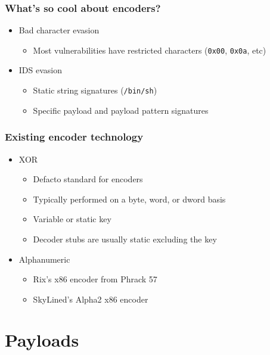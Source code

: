 \documentclass{beamer}
\newenvironment{sitemize}{\vspace{1mm}\begin{itemize}\itemsep 4pt\small}{\end{itemize}}
\begin{document}
\begin{frame}[t]
    \frametitle{What's so cool about encoders?}

    \begin{sitemize}
        \item Bad character evasion
        \begin{sitemize}
            \item Most vulnerabilities have restricted characters
            (\texttt{0x00}, \texttt{0x0a}, etc)
        \end{sitemize}

        \pause
        \item IDS evasion
        \begin{sitemize}
            \item Static string signatures
            (\texttt{/bin/sh})
            \item Specific payload and payload pattern signatures
        \end{sitemize}
    \end{sitemize}
\end{frame}

\begin{frame}[t]
    \frametitle{Existing encoder technology}

    \begin{sitemize}
        \item XOR
        \begin{sitemize}
            \item Defacto standard for encoders
            \item Typically performed on a byte, word, or dword basis
            \item Variable or static key
            \item Decoder stubs are usually static excluding the key
        \end{sitemize}

        \pause
        \item Alphanumeric
        \begin{sitemize}
            \item Rix's x86 encoder from Phrack 57
            \item SkyLined's Alpha2 x86 encoder
        \end{sitemize}
    \end{sitemize}
\end{frame}

\section{Payloads}
\end{document}
